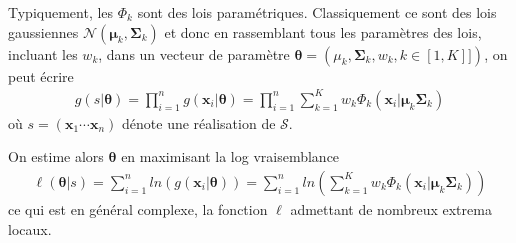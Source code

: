 \documentclass[letterpaper,10pt,french]{sphinxmanual}
\begin{document}
\sphinxAtStartPar
Typiquement, les \(\Phi_k\) sont des lois paramétriques. Classiquement ce sont des lois gaussiennes \(\mathcal N(\boldsymbol \mu_k,\boldsymbol \Sigma_k)\) et donc en rassemblant tous les paramètres des lois, incluant les \(w_k\), dans un vecteur de paramètre \(\boldsymbol \theta = (\mu_k,\boldsymbol \Sigma_k,w_k,k\in[\!1,K]\!])\), on peut écrire
\begin{equation*}
\begin{split}g(s|\boldsymbol \theta) = \prod_{i=1}^n g(\mathbf x_i|\boldsymbol \theta) = \prod_{i=1}^n \displaystyle\sum_{k=1}^K w_k \Phi_k(\mathbf x_i|\boldsymbol\mu_k \boldsymbol\Sigma_k)\end{split}
\end{equation*}
\sphinxAtStartPar
où \(s=(\mathbf x_1\cdots \mathbf x_n)\) dénote une réalisation de \(\mathcal S\).

\sphinxAtStartPar
On estime alors \(\boldsymbol\theta\) en maximisant la log vraisemblance
\begin{equation*}
\begin{split}\ell(\boldsymbol\theta|s) = \displaystyle\sum_{i=1}^n ln(g(\mathbf x_i|\boldsymbol \theta)) = \displaystyle\sum_{i=1}^n ln \left ( \displaystyle\sum_{k=1}^K w_k \Phi_k(\mathbf x_i|\boldsymbol\mu_k \boldsymbol\Sigma_k) \right )\end{split}
\end{equation*}
\sphinxAtStartPar
ce qui est en général complexe, la fonction \(\ell\) admettant de nombreux extrema locaux.
\end{document}
